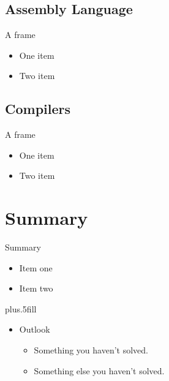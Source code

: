 \documentclass{beamer}
\begin{document}
\subsection[Assembly]{Assembly Language}

\begin{frame}{A frame}
  \begin{itemize}
  \item
    One item
  \item
    Two item
  \end{itemize}
\end{frame}


\subsection[Compilers]{Compilers}

\begin{frame}{A frame}
  \begin{itemize}
  \item
    One item
  \item
    Two item
  \end{itemize}
\end{frame}





\section{Summary}

\begin{frame}{Summary}

  \begin{itemize}
  \item
    Item one
  \item
    Item two
  \end{itemize}
  
  \vskip0pt plus.5fill
  \begin{itemize}
  \item
    Outlook
    \begin{itemize}
    \item
      Something you haven't solved.
    \item
      Something else you haven't solved.
    \end{itemize}
  \end{itemize}
\end{frame}
\end{document}
